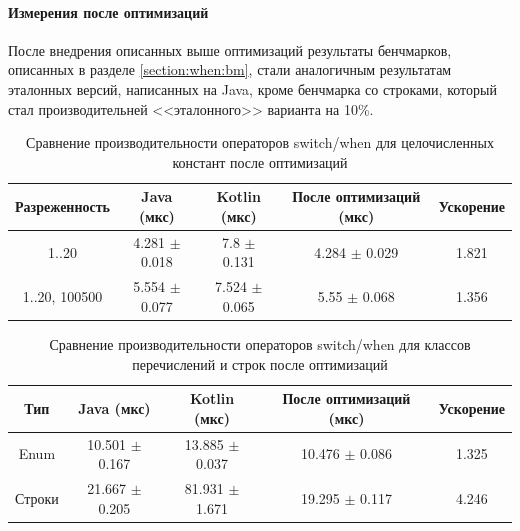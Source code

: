 \paragraph{Измерения после оптимизаций}
После внедрения описанных выше оптимизаций результаты бенчмарков, описанных
в разделе \ref{section:when:bm}, стали аналогичным результатам эталонных версий, написанных
на Java, кроме бенчмарка со строками, который стал производительней <<эталонного>> варианта на 10\%.

\begin{table}[h]
\begin{center}
\begin{tabular}{|c|c|c|c|c|} \hline
Разреженность & Java (мкс) & Kotlin (мкс) & После оптимизаций (мкс) & Ускорение \\ \hline
1..20 & 4.281 $\pm$ 0.018 & 7.8 $\pm$ 0.131 & 4.284 $\pm$ 0.029 & 1.821\\ \hline
1..20, 100500 & 5.554 $\pm$ 0.077 & 7.524 $\pm$ 0.065 & 5.55 $\pm$ 0.068 & 1.356\\ \hline
\end{tabular}
\caption{Сравнение производительности операторов switch/when для целочисленных констант после оптимизаций}
\end{center}
\end{table}

\begin{table}[h]
\begin{center}
\begin{tabular}{|c|c|c|c|c|} \hline
Тип & Java (мкс) & Kotlin (мкс) & После оптимизаций (мкс) & Ускорение \\ \hline
Enum & 10.501 $\pm$ 0.167 & 13.885 $\pm$ 0.037 & 10.476 $\pm$ 0.086 & 1.325\\ \hline
Строки & 21.667 $\pm$ 0.205 & 81.931 $\pm$ 1.671 & 19.295 $\pm$ 0.117 & 4.246\\ \hline
\end{tabular}
\caption{Сравнение производительности операторов switch/when для классов перечислений и строк после оптимизаций}
\label{bm:switch:opt}
\end{center}
\end{table}


